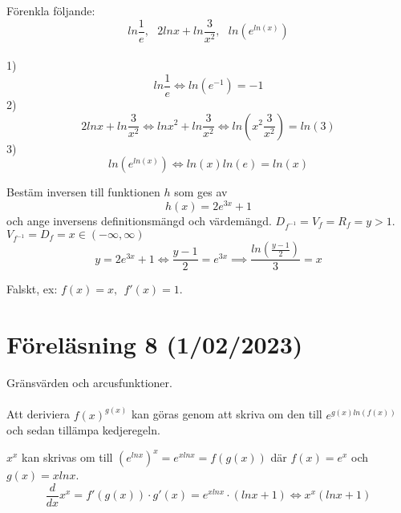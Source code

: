 \documentclass{report}
\begin{document}
\vspace{20pt}
\qs{}
{
Förenkla följande:
\begin{equation*}
	ln \frac{1}{e},\:\:\: 2lnx+ln \frac{3}{x^2},\:\:\: ln(e^{ln(x)}) 
\end{equation*}
}
\sol\\
1)\\
\begin{equation*}
	ln \frac{1}{e} \iff ln(e^{-1}) = -1
\end{equation*}
2)\\
\begin{equation*}
2lnx+ln \frac{3}{x^2} \iff lnx^2 + ln \frac{3}{x^2} \iff ln(x^2 \frac{3}{x^2} ) = ln(3)   
\end{equation*}
3)\\
\begin{equation*}
	ln(e^{ln(x)}) \iff  ln(x) ln(e) = ln(x) 
\end{equation*}
\pagebreak

\qs{}
{
Bestäm inversen till funktionen $ h $ som ges av
\begin{equation*}
	h(x) = 2e^{3x} + 1
\end{equation*}
och ange inversens definitionsmängd och värdemängd.
}
	\sol $ D_{f^{-1}} = V_f = R_f = y > 1 $. $ V_{f^{-1}} = D_f = x \in (- \infty, \infty)$  
\begin{equation*}
	y = 2e^{3x}+1 \iff \frac{y-1}{2} = e^{3x} \implies \frac{ln( \frac{y-1}{2} )}{3} =x
\end{equation*}

\vspace{30pt}
{
Falskt, ex: $ f(x) = x,\:\: f'(x) = 1 $.
}

\pagebreak
\section{Föreläsning 8 (1/02/2023)}
Gränsvärden och arcusfunktioner.\\\\

\noindent
Att deriviera $ f(x)^{g(x)} $ kan göras genom att skriva om den till $ e^{g(x)ln(f(x)) } $ och sedan tillämpa kedjeregeln.

{
	$ x^x $ kan skrivas om till $ (e^{lnx})^x = e^{xlnx} = f(g(x)) $ där $ f(x) = e^x $ och $ g(x) = xlnx $.
\begin{equation*}
	\frac{d}{dx} x^x = f'(g(x)) \cdot g'(x) = e^{xlnx} \cdot (lnx+1) \iff x^x(lnx+1)
\end{equation*}
}
\end{document}
